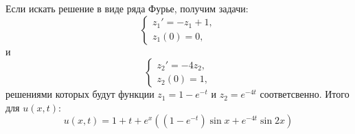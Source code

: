 \documentclass[11pt]{article}
\begin{document}
Если искать решение в виде ряда Фурье, получим задачи:
\begin{equation}
\begin{cases}
z_1' = -z_1 + 1, \\
z_1(0) = 0,
\end{cases}
\end{equation}
и
\begin{equation}
\begin{cases}
z_2' = -4z_2, \\
z_2(0) = 1,
\end{cases}
\end{equation}
решениями которых будут функции $z_1 = 1 - e^{-t}$ и $z_2 = e^{-4t}$ соответсвенно. Итого для $u(x, t)$:
\begin{equation}
u(x, t) = 1 + t + e^x((1 - e^{-t})\sin x + e^{-4t}\sin 2x)
\end{equation}
\end{document}
